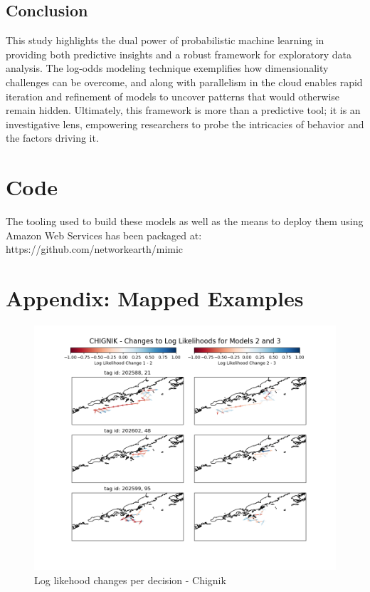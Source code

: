 \documentclass[11pt]{article}
\begin{document}
\subsection*{Conclusion}

This study highlights the dual power of probabilistic machine learning in providing both predictive insights and a robust framework for exploratory data analysis. The log-odds modeling technique exemplifies how dimensionality challenges can be overcome, and along with parallelism in the cloud enables rapid iteration and refinement of models to uncover patterns that would otherwise remain hidden. Ultimately, this framework is more than a predictive tool; it is an investigative lens, empowering researchers to probe the intricacies of behavior and the factors driving it. 


\newpage

\section*{Code}

The tooling used to build these models as well as the means to deploy them using Amazon Web Services has been packaged at: \newline https://github.com/networkearth/mimic



\newpage
\section*{Appendix: Mapped Examples}

\begin{figure}[h!] 
	\centering
  \includegraphics[width=140mm]{figures/chignik_map.png}
  \caption{Log likehood changes per decision - Chignik}
  \label{fig:chignik_map}
\end{figure}
\end{document}
